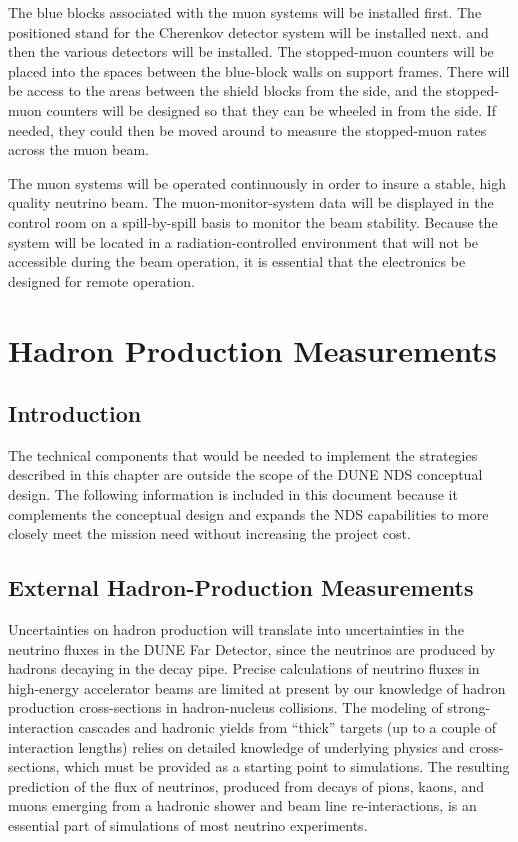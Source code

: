 The blue blocks associated with the muon systems will be installed
first.  The positioned stand for the Cherenkov detector system will be
installed next.  and then the various detectors will be installed.
The stopped-muon counters will be placed into the spaces between the
blue-block walls on support frames.  There will be access to the areas
between the shield blocks from the side, and the stopped-muon counters
will be designed so that they can be wheeled in from the side.  If
needed, they could then be moved around to measure the stopped-muon
rates across the muon beam.

The muon systems will be operated continuously in order to insure a
stable, high quality neutrino beam.  The muon-monitor-system data will
be displayed in the control room on a spill-by-spill basis to monitor
the beam stability. Because the system will be located in a
radiation-controlled environment that will not be accessible during
the beam operation, it is essential that the electronics be designed
for remote operation.

\section{Hadron Production Measurements}
\label{sec:detectors-nd-ref-hadron}

\subsection{Introduction}

The technical components that would be needed to implement the
strategies described in this chapter are outside the scope of the DUNE
NDS conceptual design. The following information is included in this document
because it complements the conceptual design and expands the NDS
capabilities to more closely meet the mission need without increasing
the project cost.

\subsection{External Hadron-Production Measurements}
\label{sec:detectors-nd-external-hadron}

Uncertainties on hadron production will translate into uncertainties
in the neutrino fluxes in the DUNE Far Detector, since the neutrinos
are produced by hadrons decaying in the decay pipe. Precise
calculations of neutrino fluxes in high-energy accelerator beams are
limited at present by our knowledge of hadron production
cross-sections in hadron-nucleus collisions.  The modeling of
strong-interaction cascades and hadronic yields from ``thick'' targets
(up to a couple of interaction lengths) relies on detailed knowledge
of underlying physics and cross-sections, which must be provided as a
starting point to simulations. The resulting prediction of the flux of
neutrinos, produced from decays of pions, kaons, and muons emerging
from a hadronic shower and beam line re-interactions, is an essential
part of simulations of most neutrino experiments.

